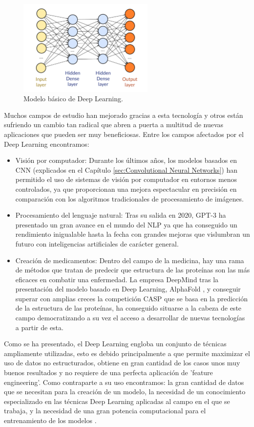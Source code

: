 \begin{figure}[H]
    \centering
    \includegraphics[width=0.6\textwidth]{Book/figures/1_introduccion/dl_model.png}
    \caption{Modelo básico de Deep Learning.}
    \label{fig:Modelo básico de Deep Learning.}
\end{figure}

Muchos campos de estudio han mejorado gracias a esta tecnología y otros están sufriendo un cambio tan radical que abren a puerta a multitud de nuevas aplicaciones que pueden ser muy beneficiosas. Entre los campos afectados por el Deep Learning encontramos:

\begin{itemize}
    \item Visión por computador: Durante los últimos años, los modelos basados en \ac{CNN} (explicados en el Capítulo \ref{sec:Convolutional Neural Networks}) han permitido el uso de sistemas de visión por computador en entornos menos controlados, ya que proporcionan una mejora espectacular en precisión en comparación con los algoritmos tradicionales de procesamiento de imágenes.
    \item Procesamiento del lenguaje natural: Tras su salida en 2020, GPT-3 \cite{GTP3} ha presentado un gran avance en el mundo del \ac{NLP} ya que ha conseguido un rendimiento inigualable hasta la fecha con grandes mejoras que vislumbran un futuro con inteligencias artificiales de carácter general.
    \item Creación de medicamentos: Dentro del campo de la medicina, hay una rama de métodos que tratan de predecir que estructura de las proteínas son las más eficaces en combatir una enfermedad. La empresa DeepMind tras la presentación del modelo basado en Deep Learning, AlphaFold \cite{AlphaFold}, y conseguir superar con amplias creces la competición \ac{CASP} que se basa en la predicción de la estructura de las proteínas, ha conseguido situarse a la cabeza de este campo democratizando a su vez el acceso a desarrollar de nuevas tecnologías a partir de esta.
\end{itemize}

Como se ha presentado, el Deep Learning engloba un conjunto de técnicas ampliamente utilizadas, esto es debido principalmente a que permite maximizar el uso de datos no estructurados, obtiene en gran cantidad de los casos unos muy buenos resultados y no requiere de una perfecta aplicación de 'feature engineering'. Como contraparte a su uso encontramos: la gran cantidad de datos que se necesitan para la creación de un modelo, la necesidad de un conocimiento especializado en las técnicas Deep Learning aplicadas al campo en el que se trabaja, y la necesidad de una gran potencia computacional para el entrenamiento de los modelos \cite{adv_disafv_dl}.
